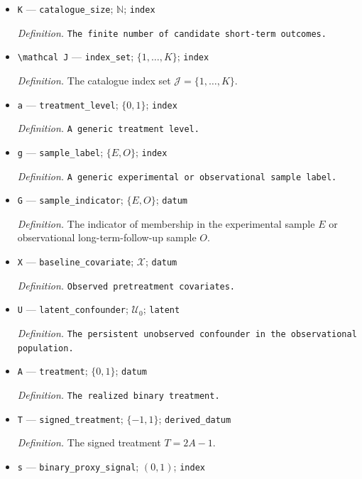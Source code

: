 \documentclass{article}
\begin{document}
\begin{itemize}
  \item \texttt{K} --- \texttt{catalogue\_\allowbreak{}size}; \(\mathbb N\); \texttt{index}
  \par\smallskip\noindent\emph{Definition.} \texttt{The finite number of candidate short-\allowbreak{}term outcomes.}
  \item \texttt{\textbackslash{}\allowbreak{}mathcal J} --- \texttt{index\_\allowbreak{}set}; \(\{1,\ldots,K\}\); \texttt{index}
  \par\smallskip\noindent\emph{Definition.} The catalogue index set \(\mathcal J=\{1,\ldots,K\}\).
  \item \texttt{a} --- \texttt{treatment\_\allowbreak{}level}; \(\{0,1\}\); \texttt{index}
  \par\smallskip\noindent\emph{Definition.} \texttt{A generic treatment level.}
  \item \texttt{g} --- \texttt{sample\_\allowbreak{}label}; \(\{E,O\}\); \texttt{index}
  \par\smallskip\noindent\emph{Definition.} \texttt{A generic experimental or observational sample label.}
  \item \texttt{G} --- \texttt{sample\_\allowbreak{}indicator}; \(\{E,O\}\); \texttt{datum}
  \par\smallskip\noindent\emph{Definition.} The indicator of membership in the experimental sample \(E\) or observational long-term-follow-up sample \(O\).
  \item \texttt{X} --- \texttt{baseline\_\allowbreak{}covariate}; \(\mathcal X\); \texttt{datum}
  \par\smallskip\noindent\emph{Definition.} \texttt{Observed pretreatment covariates.}
  \item \texttt{U} --- \texttt{latent\_\allowbreak{}confounder}; \(\mathcal U_0\); \texttt{latent}
  \par\smallskip\noindent\emph{Definition.} \texttt{The persistent unobserved confounder in the observational population.}
  \item \texttt{A} --- \texttt{treatment}; \(\{0,1\}\); \texttt{datum}
  \par\smallskip\noindent\emph{Definition.} \texttt{The realized binary treatment.}
  \item \texttt{T} --- \texttt{signed\_\allowbreak{}treatment}; \(\{-1,1\}\); \texttt{derived\_\allowbreak{}datum}
  \par\smallskip\noindent\emph{Definition.} The signed treatment \(T=2A-1\).
  \item \texttt{s} --- \texttt{binary\_\allowbreak{}proxy\_\allowbreak{}signal}; \((0,1)\); \texttt{index}

\end{itemize}
\end{document}
